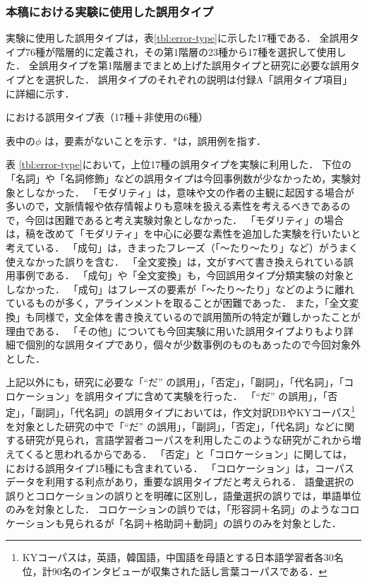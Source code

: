 \documentclass[japanese]{jnlp_1.4}
\newcommand{\ngc}{}
\begin{document}
\subsubsection{本稿における実験に使用した誤用タイプ}

実験に使用した誤用タイプは，表\ref{tbl:error-type}に示した17種である．
全誤用タイプ76種が階層的に定義され，その第1階層の23種から17種を選択して使用した．
全誤用タイプを第1階層までまとめ上げた誤用タイプと研究に必要な誤用タイプとを選択した．
誤用タイプのそれぞれの説明は付録A「誤用タイプ項目」に詳細に示す．

\begin{table}[t]
\caption{\ngc\hbox{}における誤用タイプ表（17種＋非使用の6種） }
\label{tbl:error-type}

\par\vspace{4pt}\small 表中の$\phi$ は，要素がないことを示す．*は，誤用例を指す．
\par\vspace{-0.5\Cvs}
\end{table}

表 \ref{tbl:error-type}において，上位17種の誤用タイプを実験に利用した．
下位の「名詞」や「名詞修飾」などの誤用タイプは今回事例数が少なかっため，実験対象としなかった．
「モダリティ」は，意味や文の作者の主観に起因する場合が多いので，文脈情報や依存情報よりも意味を扱える素性を考えるべきであるので，今回は困難であると考え実験対象としなかった．
「モダリティ」の場合は，稿を改めて「モダリティ」を中心に必要な素性を追加した実験を行いたいと考えている．
「成句」は，きまったフレーズ（「〜たり〜たり」など）がうまく使えなかった誤りを含む．
「全文変換」は，文がすべて書き換えられている誤用事例である．
「成句」や「全文変換」も，今回誤用タイプ分類実験の対象としなかった．
「成句」はフレーズの要素が「〜たり〜たり」などのように離れているものが多く，アラインメントを取ることが困難であった．
また，「全文変換」も同様で，文全体を書き換えているので誤用箇所の特定が難しかったことが理由である．
「その他」についても今回実験に用いた誤用タイプよりもより詳細で個別的な誤用タイプであり，個々が少数事例のものもあったので今回対象外とした．

上記以外にも，研究に必要な「``だ'' の誤用」，「否定」，「副詞」，「代名詞」，「コロケーション」を誤用タイプに含めて実験を行った．
「``だ'' の誤用」，「否定」，「副詞」，「代名詞」の誤用タイプにおいては，作文対訳DBやKYコーパス\cite{kyj}\footnote{KYコーパスは，英語，韓国語，中国語を母語とする日本語学習者各30名位，計90名のインタビューが収集された話し言葉コーパスである．}を対象とした研究の中で「``だ'' の誤用」\cite{hunt,ou}，「副詞」\cite{asada07,asada08,matsuda}，「否定」，「代名詞」などに関する研究が見られ，言語学習者コーパスを利用したこのような研究がこれから増えてくると思われるからである．
「否定」と「コロケーション」に関しては，における誤用タイプ15種にも含まれている．
「コロケーション」は，コーパスデータを利用する利点があり，重要な誤用タイプだと考えられる\cite{terashima}．
語彙選択の誤りとコロケーションの誤りとを明確に区別し，語彙選択の誤りでは，単語単位のみを対象とした．
コロケーションの誤りでは，「形容詞＋名詞」のようなコロケーションも見られるが「名詞＋格助詞＋動詞」の誤りのみを対象とした．
\end{document}

